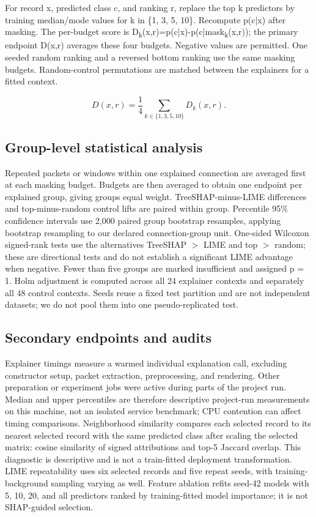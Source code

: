 \documentclass[journal,letterpaper]{IEEEtran}
\begin{document}
For record x, predicted class c, and ranking r, replace the top k predictors by training median/mode values for k in \{1, 3, 5, 10\}. Recompute p(c|x) after masking. The per-budget score is D\textsubscript{k}(x,r)=p(c|x)-p(c|mask\textsubscript{k}(x,r)); the primary endpoint D(x,r) averages these four budgets. Negative values are permitted. One seeded random ranking and a reversed bottom ranking use the same masking budgets. Random-control permutations are matched between the explainers for a fitted context.

\begin{equation} D(x,r)=\frac{1}{4}\sum_{k\in\{1,3,5,10\}} D_k(x,r).\label{eq:deletion}\end{equation}
\subsection{Group-level statistical analysis}
Repeated packets or windows within one explained connection are averaged first at each masking budget. Budgets are then averaged to obtain one endpoint per explained group, giving groups equal weight. TreeSHAP-minus-LIME differences and top-minus-random control lifts are paired within group. Percentile 95\% confidence intervals use 2,000 paired group bootstrap resamples, applying bootstrap resampling \cite{ref34} to our declared connection-group unit. One-sided Wilcoxon signed-rank tests \cite{ref35} use the alternatives TreeSHAP \ensuremath{>} LIME and top \ensuremath{>} random; these are directional tests and do not establish a significant LIME advantage when negative. Fewer than five groups are marked insufficient and assigned p = 1. Holm adjustment \cite{ref36} is computed across all 24 explainer contexts and separately all 48 control contexts. Seeds reuse a fixed test partition and are not independent datasets; we do not pool them into one pseudo-replicated test.

\subsection{Secondary endpoints and audits}
Explainer timings measure a warmed individual explanation call, excluding constructor setup, packet extraction, preprocessing, and rendering. Other preparation or experiment jobs were active during parts of the project run. Median and upper percentiles are therefore descriptive project-run measurements on this machine, not an isolated service benchmark; CPU contention can affect timing comparisons. Neighborhood similarity compares each selected record to its nearest selected record with the same predicted class after scaling the selected matrix: cosine similarity of signed attributions and top-5 Jaccard overlap. This diagnostic is descriptive and is not a train-fitted deployment transformation. LIME repeatability uses six selected records and five repeat seeds, with training-background sampling varying as well. Feature ablation refits seed-42 models with 5, 10, 20, and all predictors ranked by training-fitted model importance; it is not SHAP-guided selection.
\end{document}
